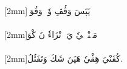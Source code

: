 \documentclass[a4paper, 12pt]{report}
\begin{document}
\begin{flushright}
{\scriptsize{}[2mm]}\textarabic{يَپَسَ وَڤُڤِ وٗتٖ وَفُوَتٖ} \\ 

 \\ 

{\scriptsize{}[2mm]}\textarabic{مَئٖنْدٖلٖيٗ يَ وٖنْزَاءٗ نَ كْوَ} \\ 

 \\ 

{\scriptsize{}[2mm]}\textarabic{كُفَنْيَ هِڤْيٗ هَپَنَ شَكَ وَتَفَئُلُ.} \\ 

 \\ 

\end{flushright}
\end{document}

